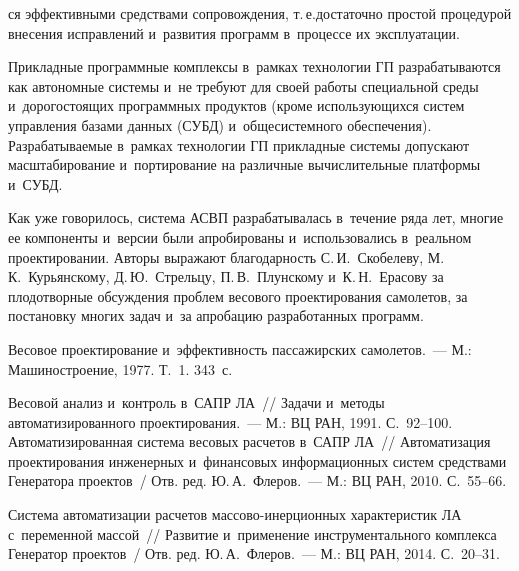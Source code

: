 \begin{multicols}{2}
\pagebreak

\noindent
ся эффективными средствами сопровождения, т.\,е.\linebreak достаточно 
простой процедурой внесения ис\-прав\-ле\-ний и~развития программ в~процессе их 
эксплу\-а\-тации. 

Прикладные программные комплексы в~рамках технологии ГП 
разрабатываются как автономные системы и~не требуют для своей работы 
специальной среды и~дорогостоящих программных продуктов (кроме 
использующихся систем управления базами данных
(СУБД) и~общесистемного обеспечения). Разрабатываемые 
в~рамках технологии ГП прикладные системы допускают масштабирование 
и~портирование на различные вычислительные платформы и~СУБД.
  
  \bigskip
  
  Как уже говорилось, система АСВП разрабатывалась в~течение ряда лет, 
многие ее компоненты и~версии были апробированы и~использовались 
в~реальном проектировании. 
%
Авторы выражают благодарность 
С.\,И.~Скобелеву, М.\,К.~Курьянскому, Д.\,Ю.~Стрель\-цу, П.\,В.~Плунскому 
и~К.\,Н.~Ерасову за плодотворные обсуждения проблем весового проектирования 
самолетов, за постановку многих задач и~за апробацию разработанных 
программ.


{\small\frenchspacing
 {%
 \begin{thebibliography}{9}
 Весовое проектирование и~эффективность 
пассажирских самолетов.~--- М.: Машиностроение, 1977.   Т.~1. 343~с.


 Весовой анализ и~контроль в~САПР ЛА~// Задачи 
и~методы автоматизированного проектирования.~--- М.: ВЦ РАН, 1991. С.~92--100.
 Автоматизированная система весовых расчетов в~САПР ЛА~// 
Автоматизация проектирования инженерных и~финансовых информационных систем 
средствами Генератора проектов~/ Отв. ред. Ю.\,А.~Флеров.~--- М.: ВЦ РАН, 
2010. С.~55--66.

\vspace*{6pt}

 Система автоматизации расчетов 
массово-инерционных характеристик ЛА с~переменной массой~// Развитие и~применение 
инструментального комплекса Генератор проектов~/ Отв. ред. Ю.\,А.~Флеров.~--- 
М.: ВЦ РАН, 2014. С.~20--31.
{

}
\end{thebibliography}}}
\end{multicols}
